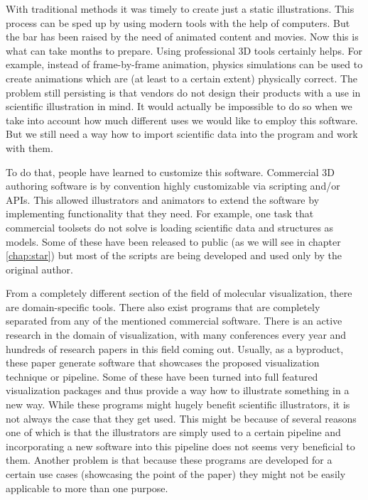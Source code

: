 \documentclass[
  digital, %
  table,   %
  nolof,     %
  nolot,     %
]{fithesis3}
\begin{document}
With traditional methods it was timely to create just a static illustrations. This process can be sped up by using modern tools with the help of computers. But the bar has been raised by the need of animated content and movies. Now this is what can take months to prepare. Using professional 3D tools certainly helps. For example, instead of frame-by-frame animation, physics simulations can be used to create animations which are (at least to a certain extent) physically correct. The problem still persisting is that vendors do not design their products with a use in scientific illustration in mind. It would actually be impossible to do so when we take into account how much different uses we would like to employ this software. But we still need a way how to import scientific data into the program and work with them.

To do that, people have learned to customize this software\cite{GrahamGaelInterview}. Commercial 3D authoring software is by convention highly customizable via scripting and/or APIs. This allowed illustrators and animators to extend the software by implementing functionality that they need. For example, one task that commercial toolsets do not solve is loading scientific data and structures as models. Some of these have been released to public (as we will see in chapter \ref{chap:star}) but most of the scripts are being developed and used only by the original author.

From a completely different section of the field of molecular visualization, there are domain-specific tools.
There also exist programs that are completely separated from any of the mentioned commercial software. There is an active research in the domain of visualization, with many conferences every year and hundreds of research papers in this field coming out. Usually, as a byproduct, these paper generate software that showcases the proposed visualization technique or pipeline. Some of these have been turned into full featured visualization packages and thus provide a way how to illustrate something in a new way. While these programs might hugely benefit scientific illustrators, it is not always the case that they get used. This might be because of several reasons one of which is that the illustrators are simply used to a certain pipeline and incorporating a new software into this pipeline does not seems very beneficial to them. Another problem is that because these programs are developed for a certain use cases (showcasing the point of the paper) they might not be easily applicable to more than one purpose.
\end{document}
